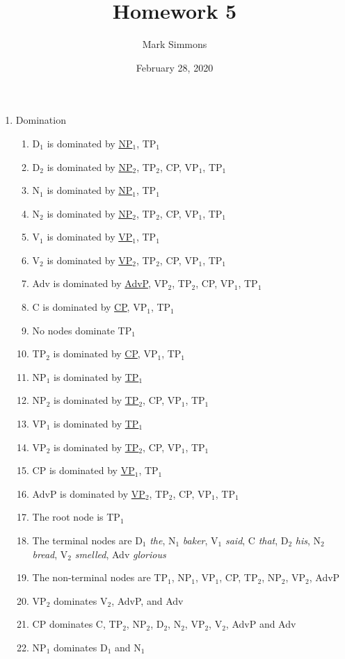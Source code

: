 \documentclass[12pt]{article}
\title{Homework 5}
\author{Mark Simmons}
\date{February 28, 2020}
\begin{document}
\maketitle

\begin{enumerate}

\item Domination
\begin{enumerate}[label=\arabic*)]
\item D$_{1}$ is dominated by \underline{NP$_{1}$}, TP$_{1}$
\item D$_{2}$ is dominated by \underline{NP$_{2}$}, TP$_{2}$, CP, VP$_{1}$, TP$_{1}$
\item N$_{1}$ is dominated by \underline{NP$_{1}$}, TP$_{1}$
\item N$_{2}$ is dominated by \underline{NP$_{2}$}, TP$_{2}$, CP, VP$_{1}$, TP$_{1}$
\item V$_{1}$ is dominated by \underline{VP$_{1}$}, TP$_{1}$
\item V$_{2}$ is dominated by \underline{VP$_{2}$}, TP$_{2}$, CP, VP$_{1}$, TP$_{1}$
\item Adv is dominated by \underline{AdvP}, VP$_{2}$, TP$_{2}$, CP, VP$_{1}$, TP$_{1}$
\item C is dominated by \underline{CP}, VP$_{1}$, TP$_{1}$
\item No nodes dominate TP$_{1}$
\item TP$_{2}$ is dominated by \underline{CP}, VP$_{1}$, TP$_{1}$
\item NP$_{1}$ is dominated by \underline{TP$_{1}$}
\item NP$_{2}$ is dominated by \underline{TP$_{2}$}, CP, VP$_{1}$, TP$_{1}$
\item VP$_{1}$ is dominated by \underline{TP$_{1}$}
\item VP$_{2}$ is dominated by \underline{TP$_{2}$}, CP, VP$_{1}$, TP$_{1}$
\item CP is dominated by \underline{VP$_{1}$}, TP$_{1}$
\item AdvP is dominated by \underline{VP$_{2}$}, TP$_{2}$, CP, VP$_{1}$, TP$_{1}$
\item The root node is TP$_{1}$
\item The terminal nodes are D$_{1}$ \emph{the}, N$_{1}$ \emph{baker}, V$_{1}$ \emph{said}, C \emph{that}, D$_{2}$ \emph{his}, N$_{2}$ \emph{bread}, V$_{2}$ \emph{smelled}, Adv \emph{glorious}\
\item The non-terminal nodes are TP$_{1}$, NP$_{1}$, VP$_{1}$, CP, TP$_{2}$, NP$_{2}$, VP$_{2}$, AdvP
\item VP$_{2}$ dominates V$_{2}$, AdvP, and Adv
\item CP dominates C, TP$_{2}$, NP$_{2}$, D$_{2}$, N$_{2}$, VP$_{2}$, V$_{2}$, AdvP and Adv
\item NP$_{1}$ dominates D$_{1}$ and N$_{1}$
\end{enumerate}


\end{enumerate}
\end{document}
